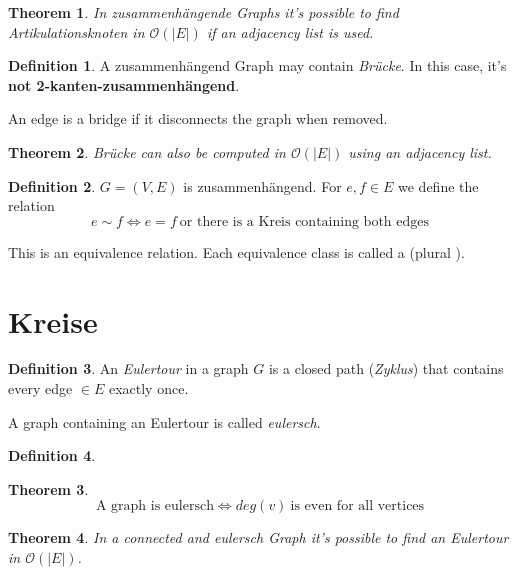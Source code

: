 \documentclass[12pt]{extarticle}
\theoremstyle{definition}
\newtheorem{definition}{Definition}
\theoremstyle{remark}
\theoremstyle{plain}
\newtheorem{theorem}{Theorem}
\newcommand{\BO}{\mathcal{O}}
\begin{document}
\begin{theorem}
    In zusammenhängende Graphs it's possible to find Artikulationsknoten in $\BO(|E|)$ if an adjacency list is used.
\end{theorem}

\begin{definition}
    A zusammenhängend Graph may contain \textit{Brücke}. In this case, it's \textbf{not 2-kanten-zusammenhängend}.

    An edge is a bridge if it disconnects the graph when removed.
\end{definition}

\begin{theorem}
    Brücke can also be computed in $\BO(|E|)$ using an adjacency list.
\end{theorem}

\begin{definition}
    $G = (V,E)$ is zusammenhängend. For $e,f \in E$ we define the relation
    \[ e \sim f \Leftrightarrow e = f\ \mbox{or there is a Kreis containing both edges} \]
    
    This is an equivalence relation. Each equivalence class is called a  (plural ).
\end{definition}

\section{Kreise}

\begin{definition}
    An \textit{Eulertour} in a graph $G$ is a closed path (\textit{Zyklus}) that contains every edge $\in E$ exactly once.

    A graph containing an Eulertour is called \textit{eulersch}.
\end{definition}

\begin{definition}
    
\end{definition}

\begin{theorem}
    \[ \mbox{A graph is eulersch} \Leftrightarrow deg(v)\ \mbox{is even for all vertices}\]
\end{theorem}

\begin{theorem}
    In a connected and eulersch Graph it's possible to find an Eulertour in $\BO(|E|)$.
\end{theorem}
\end{document}
